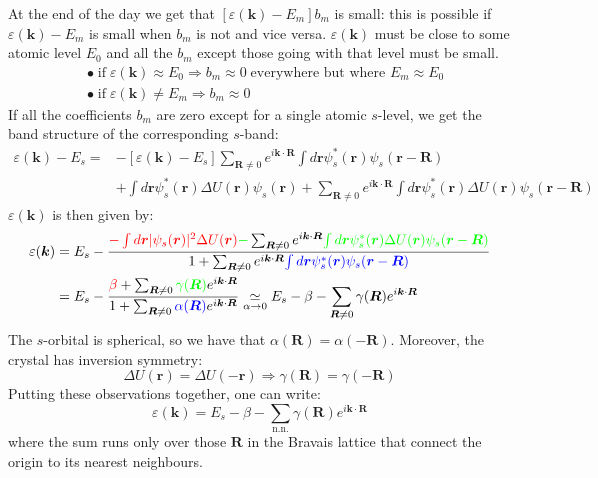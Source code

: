 \documentclass[10.75pt,a4paper,openright,bottom=2cm]{article}
\renewcommand{\Vec}[1]{\boldsymbol{#1}}
\begin{document}
At the end of the day we get that $[\varepsilon(\Vec{k})-E_m]b_m$ is small: this is possible if $\varepsilon(\Vec{k})-E_m$ is small when $b_m$ is not and vice versa. $\varepsilon(\Vec{k})$ must be close to some atomic level $E_0$ and all the $b_m$ except those going with that level must be small.
\[
\begin{aligned}
&\bullet\;\text{if}\;\varepsilon(\Vec{k})\approx E_0 \Rightarrow b_m\approx0\;\text{everywhere but where $E_m\approx E_0$}\\ &\bullet\;\text{if}\;\varepsilon(\Vec{k})\neq E_m\Rightarrow b_m\approx0
\end{aligned}
\]
If all the coefficients $b_m$ are zero except for a single atomic $s$-level, we get the band structure of the corresponding $s$-band:
\begin{align*}
\varepsilon(\Vec{k})-E_s=&-[\varepsilon(\Vec{k})-E_s]\sum_{\Vec{R}\neq0}e^{i\Vec{k}\cdot\Vec{R}}\int d\Vec{r}\psi_s^*(\Vec{r})\psi_s(\Vec{r}-\Vec{R})\\
&+\int d\Vec{r}\psi_s^*(\Vec{r})\Delta U(\Vec{r})\psi_s(\Vec{r})+\sum_{\Vec{R}\neq0}e^{i\Vec{k}\cdot\Vec{R}}\int d\Vec{r}\psi_s^*(\Vec{r})\Delta U(\Vec{r})\psi_s(\Vec{r}-\Vec{R})
\end{align*}
$\varepsilon(\Vec{k})$ is then given by:
\begin{equation}
\label{betagamma}
\begin{aligned}
\varepsilon(\Vec{k})&=E_s-\frac{{\color{red}{-\int d\Vec{r}|\psi_s(\Vec{r})|^2\Delta U(\Vec{r})}}{\color{green}{-}}\sum_{\Vec{R}\neq0}e^{i\Vec{k}\cdot\Vec{R}}{\color{green}{\int d\Vec{r}\psi_s^*(\Vec{r})\Delta U(\Vec{r})\psi_s(\Vec{r}-\Vec{R})}}}{1+\sum_{\Vec{R}\neq0}e^{i\Vec{k}\cdot\Vec{R}}{\color{blue}{\int d\Vec{r}\psi_s^*(\Vec{r})\psi_s(\Vec{r}-\Vec{R})}}}\\
&=E_s-\frac{{\color{red}{\beta}}+\sum_{\Vec{R}\neq0}{\color{green}{\gamma(\Vec{R})}}e^{i\Vec{k}\cdot\Vec{R}}}{1+\sum_{\Vec{R}\neq0}{\color{blue}{\alpha(\Vec{R})}}e^{i\Vec{k}\cdot\Vec{R}}}\underset{\alpha\to0}{\simeq}E_s-\beta-\sum_{\Vec{R}\neq0}\gamma(\Vec{R})e^{i\Vec{k}\cdot\Vec{R}}
\end{aligned}
\end{equation}
The $s$-orbital is spherical, so we have that $\alpha(\Vec{R})=\alpha(-\Vec{R})$. Moreover, the crystal has inversion symmetry:
\[
\Delta U(\Vec{r})=\Delta U(-\Vec{r})\Rightarrow\gamma(\Vec{R})=\gamma(-\Vec{R})
\]
Putting these observations together, one can write:
\[
\varepsilon(\Vec{k})=E_s-\beta-\sum_{\text{n.n.}}\gamma(\Vec{R})e^{i\Vec{k}\cdot\Vec{R}}
\]
where the sum runs only over those $\Vec{R}$ in the Bravais lattice that connect the origin to its nearest neighbours.\\
\end{document}
